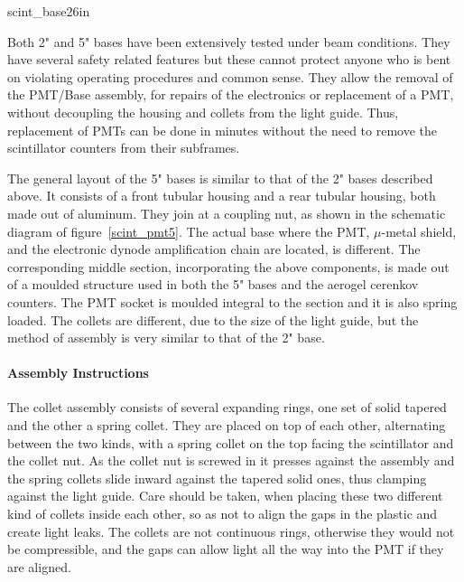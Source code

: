 {scint_base2}{6in}


   Both 2" and 5" bases have been extensively tested under beam conditions. 
They have several safety related features but these cannot protect anyone who 
is bent on violating operating procedures and common sense. They allow the 
removal of the PMT/Base assembly, for repairs of the electronics or replacement 
of a PMT, without decoupling the housing and collets from the light guide. 
Thus, replacement of PMTs can be done in minutes without the need to remove the 
scintillator counters from their subframes.




   The general layout of the 5" bases is similar to that of the 2" bases
described above. It consists of a front tubular housing and a rear tubular
housing, both made out of aluminum. They join at a coupling nut, as shown in
the schematic diagram of figure~\ref{scint_pmt5}. The actual base where the PMT, $\mu$-metal
shield, and the electronic dynode amplification chain are located, is
different. The corresponding middle section, incorporating the above
components, is made out of a moulded structure used in both the 5" bases and
the aerogel cerenkov counters. The PMT socket is moulded integral to the
section and it is also spring loaded. The collets are different, due to the
size of the light guide, but the method of assembly is very similar to that of
the 2" base. 


\paragraph{Assembly Instructions}

   The collet assembly consists of several expanding rings, one set of solid
tapered and the other a spring collet. They are placed on top of each other,
alternating between the two kinds, with a spring collet on the top facing the
scintillator and the collet nut. As the collet nut is screwed in it presses
against the assembly and the spring collets slide inward against the tapered
solid ones, thus clamping against the light guide. Care should be taken, when
placing these two different kind of collets inside each other, so as not to
align the gaps in the plastic and create light leaks. The collets are not
continuous rings, otherwise they would not be compressible, and the gaps can
allow light all the way into the PMT if they are aligned. 

